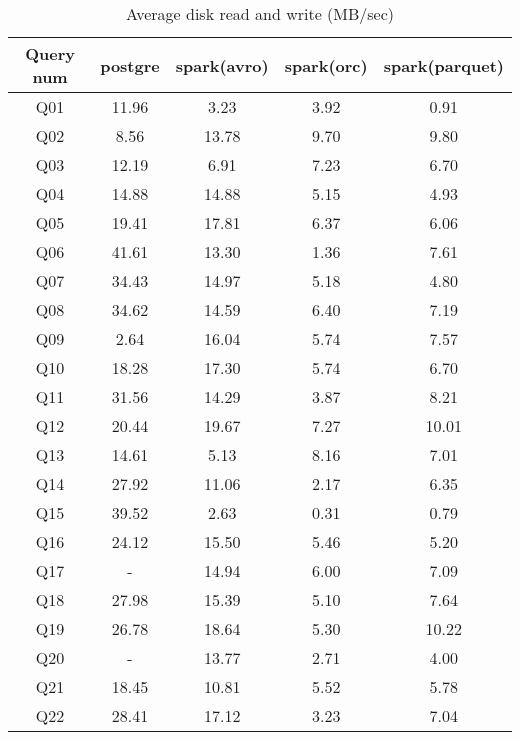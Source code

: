 \documentclass[../main.tex]{subfiles}
\begin{document}
    \begin{table}
        \begin{center}
            \begin{tabular}{ |c|c|c|c|c| } 
            \hline
            Query num & postgre & spark(avro) & spark(orc) & spark(parquet) \\
            \hline
            Q01 & 11.96 & 3.23 & 3.92 & 0.91 \\
            Q02 & 8.56 & 13.78 & 9.70 & 9.80 \\
            Q03 & 12.19 & 6.91 & 7.23 & 6.70 \\
            Q04 & 14.88 & 14.88 & 5.15 & 4.93 \\
            Q05 & 19.41 & 17.81 & 6.37 & 6.06 \\
            Q06 & 41.61 & 13.30 & 1.36 & 7.61 \\
            Q07 & 34.43 & 14.97 & 5.18 & 4.80 \\
            Q08 & 34.62 & 14.59 & 6.40 & 7.19 \\
            Q09 & 2.64 & 16.04 & 5.74 & 7.57 \\
            Q10 & 18.28 & 17.30 & 5.74 & 6.70 \\
            Q11 & 31.56 & 14.29 & 3.87 & 8.21 \\
            Q12 & 20.44 & 19.67 & 7.27 & 10.01 \\
            Q13 & 14.61 & 5.13 & 8.16 & 7.01 \\
            Q14 & 27.92 & 11.06 & 2.17 & 6.35 \\
            Q15 & 39.52 & 2.63 & 0.31 & 0.79 \\
            Q16 & 24.12 & 15.50 & 5.46 & 5.20 \\
            Q17 & - & 14.94 & 6.00 & 7.09 \\
            Q18 & 27.98 & 15.39 & 5.10 & 7.64 \\
            Q19 & 26.78 & 18.64 & 5.30 & 10.22 \\
            Q20 & - & 13.77 & 2.71 & 4.00 \\
            Q21 & 18.45 & 10.81 & 5.52 & 5.78 \\
            Q22 & 28.41 & 17.12 & 3.23 & 7.04 \\
            \hline
            \end{tabular}
            \\[1pt]
            \caption{Average disk read and write (MB/sec)}
        \end{center}
    \end{table}
\end{document}

